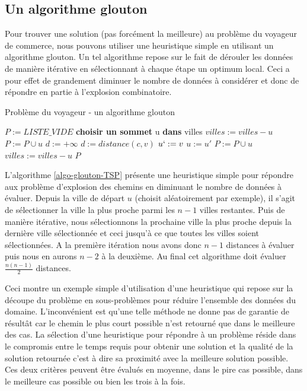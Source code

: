 \subsection{Un algorithme glouton}
Pour trouver une solution (pas forcément la meilleure) au problème du voyageur de commerce, nous pouvons utiliser une heuristique simple en utilisant un algorithme glouton. Un tel algorithme repose sur le fait de dérouler les données de manière itérative en sélectionnant à chaque étape un optimum local. Ceci a pour effet de grandement diminuer le nombre de données à considérer et donc de répondre en partie à l'explosion combinatoire.

\begin{algorithm}
\caption{Problème du voyageur - un algorithme glouton} 
\label{algo-glouton-TSP}
\begin{algorithmic}
    \State $P := LISTE\_VIDE$
    \State \textbf{choisir un sommet} u \textbf{dans} villes
    \State $villes := villes - u$
    \State $P := P \cup u$
        \State $d := +\infty$
                \State $d := distance(c, v)$
                \State $u` := v$
            \EndIf
        \EndFor
        \State $u := u'$
        \State $P := P \cup u$
        \State $villes := villes - u$
    \EndWhile
    \State \Return $P$
\EndFunction
\end{algorithmic}
\end{algorithm}

L'algorithme \ref{algo-glouton-TSP} présente une heuristique simple pour répondre aux problème d'explosion des chemins en diminuant le nombre de données à évaluer. 
Depuis la ville de départ $u$ (choisit aléatoirement par exemple), il s'agit de sélectionner la ville la plus proche parmi les $n-1$ villes restantes. Puis de manière itérative, nous sélectionnons la prochaine ville la plus proche depuis la dernière ville sélectionnée et ceci jusqu'à ce que toutes les villes soient sélectionnées. 
A la première itération nous avons donc $n-1$ distances à évaluer puis nous en aurons $n-2$ à la deuxième. Au final cet algorithme doit évaluer $\frac{n(n-1)}{2}$ distances. 

\newpage

Ceci montre un exemple simple d'utilisation d'une heuristique qui repose sur la découpe du problème en sous-problèmes pour réduire l'ensemble des données du domaine. L'inconvénient est qu'une telle méthode ne donne pas de garantie de résultât car le chemin le plus court possible n'est retourné que dans le meilleure des cas.
La sélection d'une heuristique pour répondre à un problème réside dans le compromis entre le temps requis pour obtenir une solution et la qualité de la solution retournée c'est à dire sa proximité avec la meilleure solution possible. 
Ces deux critères peuvent être évalués en moyenne, dans le pire cas possible, dans le meilleure cas possible ou bien les trois à la fois. \\

